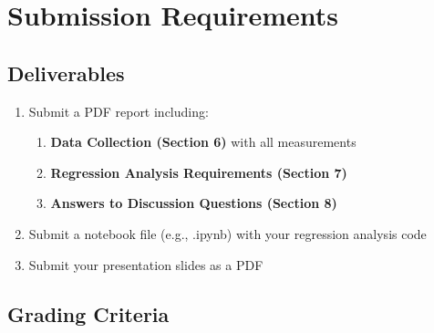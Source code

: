\documentclass[11pt,twoside]{article}
\numberwithin{equation}{section}
\newcommand{\?}{\stackrel{?}{=}}
\begin{document}








\section{Submission Requirements}


\subsection{Deliverables}
\begin{enumerate}
    \item Submit a PDF report including:
\begin{enumerate}
    \item \textbf{Data Collection (Section 6)} with all measurements
    \item \textbf{Regression Analysis Requirements (Section 7)}
    \item \textbf{Answers to Discussion Questions (Section 8)}
\end{enumerate}
\item Submit a notebook file (e.g., .ipynb) with your regression analysis code
\item Submit your presentation slides as a PDF
\end{enumerate}


\subsection{Grading Criteria}
\end{document}
